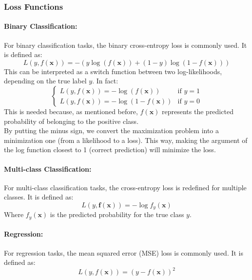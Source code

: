\subsubsection{Loss Functions}
\paragraph{Binary Classification:}
For binary classification tasks, the binary cross-entropy loss is commonly used. It is defined as:
\[ L(y, f(\boldsymbol{x})) = - (y \log(f(\boldsymbol{x})) + (1 - y) \log(1 - f(\boldsymbol{x}))) \]
This can be interpreted as a switch function between two log-likelihoods, depending on the true label $y$. 
In fact:
\[
  \begin{cases}
  L(y, f(\boldsymbol{x})) = - \log(f(\boldsymbol{x})) & \text{if } y = 1 \\
  L(y, f(\boldsymbol{x})) = - \log(1 - f(\boldsymbol{x})) & \text{if } y = 0
  \end{cases}
\]
This is needed because, as mentioned before, $f(\boldsymbol{x})$ represents the predicted probability of belonging to the positive class. 
\\By putting the minus sign, we convert the maximization problem into a minimization one (from a likelihood to a loss).
This way, making the argument of the log function closest to 1 (correct prediction) will minimize the loss.

\paragraph{Multi-class Classification:}
For multi-class classification tasks, the cross-entropy loss is redefined for multiple classes. It is defined as:
\[ L(y, \boldsymbol{f}(\boldsymbol{x})) = - \log f_y(\boldsymbol{x}) \]
Where $f_y(\boldsymbol{x})$ is the predicted probability for the true class $y$.

\paragraph{Regression:}
For regression tasks, the mean squared error (MSE) loss is commonly used. It is defined as:
\[ L(y, f(\boldsymbol{x})) = (y - f(\boldsymbol{x}))^2 \]

